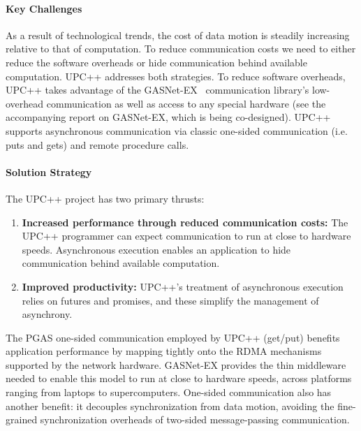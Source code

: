 \paragraph{Key  Challenges}

As a result of technological trends, the cost of data motion is steadily increasing relative to that of computation.  To reduce communication costs we need to 
either reduce the software overheads or hide  communication behind available computation. UPC++ addresses both strategies.
To reduce software overheads, UPC++ takes advantage of the GASNet-EX~\cite{gasnet-lcpc18,gasnet-site}
communication library's 
low-overhead communication as well as access to any special hardware
(see the accompanying report on GASNet-EX, which is being co-designed).
UPC++ supports asynchronous communication via classic one-sided communication
(i.e. puts and gets) and remote procedure calls.



\paragraph{Solution Strategy}

The UPC++ project has two primary thrusts:
\begin{enumerate}
\item \textbf{Increased performance through reduced communication costs:} The
UPC++ programmer can expect communication to run at close to hardware speeds.
Asynchronous execution enables an application to hide communication behind
available computation.

\item \textbf{Improved productivity:}  UPC++'s treatment of asynchronous
execution relies on futures and promises, and these simplify the management of
asynchrony.

\end{enumerate}

The PGAS one-sided communication employed by UPC++ (get/put)
benefits application  performance by mapping tightly onto the RDMA mechanisms
supported by the network hardware. GASNet-EX provides the
thin middleware
needed to enable this model to run at close to hardware speeds, across platforms ranging from laptops to supercomputers.
One-sided communication also has another benefit:
it decouples synchronization from data motion,
avoiding the fine-grained synchronization overheads of two-sided message-passing communication.

